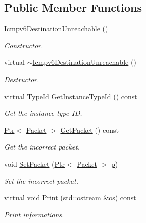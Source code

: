 \subsection*{Public Member Functions}
\begin{DoxyCompactItemize}
\item 
\hyperlink{classns3_1_1Icmpv6DestinationUnreachable_a59ad98e08bf1349a60a2affd1747f915}{Icmpv6\+Destination\+Unreachable} ()
\begin{DoxyCompactList}\small\item\em Constructor. \end{DoxyCompactList}\item 
virtual \hyperlink{classns3_1_1Icmpv6DestinationUnreachable_a9a79f77040817793f7ca6a17f5e3ad89}{$\sim$\+Icmpv6\+Destination\+Unreachable} ()
\begin{DoxyCompactList}\small\item\em Destructor. \end{DoxyCompactList}\item 
virtual \hyperlink{classns3_1_1TypeId}{Type\+Id} \hyperlink{classns3_1_1Icmpv6DestinationUnreachable_ab2b30b7cc3e0a50b5a66d82736e350b7}{Get\+Instance\+Type\+Id} () const 
\begin{DoxyCompactList}\small\item\em Get the instance type ID. \end{DoxyCompactList}\item 
\hyperlink{classns3_1_1Ptr}{Ptr}$<$ \hyperlink{classns3_1_1Packet}{Packet} $>$ \hyperlink{classns3_1_1Icmpv6DestinationUnreachable_ac6e5210726687931433381a1fce4251f}{Get\+Packet} () const 
\begin{DoxyCompactList}\small\item\em Get the incorrect packet. \end{DoxyCompactList}\item 
void \hyperlink{classns3_1_1Icmpv6DestinationUnreachable_a12205eb015e8b80cd8ad653aa6794c9a}{Set\+Packet} (\hyperlink{classns3_1_1Ptr}{Ptr}$<$ \hyperlink{classns3_1_1Packet}{Packet} $>$ \hyperlink{lte__link__budget__x2__handover__measures_8m_ac9de518908a968428863f829398a4e62}{p})
\begin{DoxyCompactList}\small\item\em Set the incorrect packet. \end{DoxyCompactList}\item 
virtual void \hyperlink{classns3_1_1Icmpv6DestinationUnreachable_a964e3442a390e95e5a5a0957a9ac8e60}{Print} (std\+::ostream \&os) const 
\begin{DoxyCompactList}\small\item\em Print informations. \end{DoxyCompactList}\item 

\end{DoxyCompactItemize}
